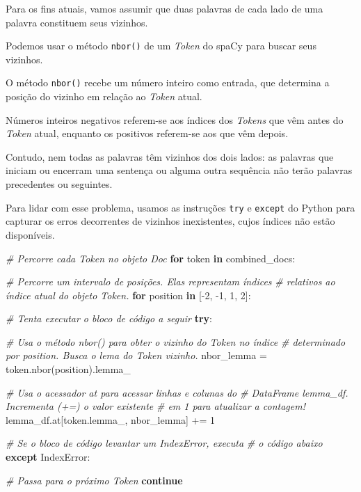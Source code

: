 \documentclass[
  brazilian,
]{article}
\newenvironment{Shaded}{}{}
\newcommand{\CommentTok}[1]{\textcolor[rgb]{0.38,0.63,0.69}{\textit{#1}}}
\newcommand{\ControlFlowTok}[1]{\textcolor[rgb]{0.00,0.44,0.13}{\textbf{#1}}}
\newcommand{\DecValTok}[1]{\textcolor[rgb]{0.25,0.63,0.44}{#1}}
\newcommand{\KeywordTok}[1]{\textcolor[rgb]{0.00,0.44,0.13}{\textbf{#1}}}
\newcommand{\NormalTok}[1]{#1}
\newcommand{\OperatorTok}[1]{\textcolor[rgb]{0.40,0.40,0.40}{#1}}
\newcommand{\PreprocessorTok}[1]{\textcolor[rgb]{0.74,0.48,0.00}{#1}}
\begin{document}
Para os fins atuais, vamos assumir que duas palavras de cada lado de uma
palavra constituem seus vizinhos.

Podemos usar o método \texttt{nbor()} de um \emph{Token} do spaCy para
buscar seus vizinhos.

O método \texttt{nbor()} recebe um número inteiro como entrada, que
determina a posição do vizinho em relação ao \emph{Token} atual.

Números inteiros negativos referem-se aos índices dos \emph{Tokens} que
vêm antes do \emph{Token} atual, enquanto os positivos referem-se aos
que vêm depois.

Contudo, nem todas as palavras têm vizinhos dos dois lados: as palavras
que iniciam ou encerram uma sentença ou alguma outra sequência não terão
palavras precedentes ou seguintes.

Para lidar com esse problema, usamos as instruções \texttt{try} e
\texttt{except} do Python para capturar os erros decorrentes de vizinhos
inexistentes, cujos índices não estão disponíveis.

\begin{Shaded}
\begin{Highlighting}[]
\CommentTok{\# Percorre cada Token no objeto Doc}
\ControlFlowTok{for}\NormalTok{ token }\KeywordTok{in}\NormalTok{ combined\_docs:}

    \CommentTok{\# Percorre um intervalo de posições. Elas representam índices}
    \CommentTok{\# relativos ao índice atual do objeto Token.}
    \ControlFlowTok{for}\NormalTok{ position }\KeywordTok{in}\NormalTok{ [}\OperatorTok{{-}}\DecValTok{2}\NormalTok{, }\OperatorTok{{-}}\DecValTok{1}\NormalTok{, }\DecValTok{1}\NormalTok{, }\DecValTok{2}\NormalTok{]:}

        \CommentTok{\# Tenta executar o bloco de código a seguir}
        \ControlFlowTok{try}\NormalTok{:}

            \CommentTok{\# Usa o método nbor() para obter o vizinho do Token no índice}
            \CommentTok{\# determinado por \textquotesingle{}position\textquotesingle{}. Busca o lema do Token vizinho.}
\NormalTok{            nbor\_lemma }\OperatorTok{=}\NormalTok{ token.nbor(position).lemma\_}

            \CommentTok{\# Usa o acessador \textquotesingle{}at\textquotesingle{} para acessar linhas e colunas do}
            \CommentTok{\# DataFrame \textquotesingle{}lemma\_df\textquotesingle{}. Incrementa (+=) o valor existente}
            \CommentTok{\# em 1 para atualizar a contagem!}
\NormalTok{            lemma\_df.at[token.lemma\_, nbor\_lemma] }\OperatorTok{+=} \DecValTok{1}

        \CommentTok{\# Se o bloco de código levantar um IndexError, executa}
        \CommentTok{\# o código abaixo}
        \ControlFlowTok{except} \PreprocessorTok{IndexError}\NormalTok{:}

            \CommentTok{\# Passa para o próximo Token}
            \ControlFlowTok{continue}
\end{Highlighting}
\end{Shaded}
\end{document}
